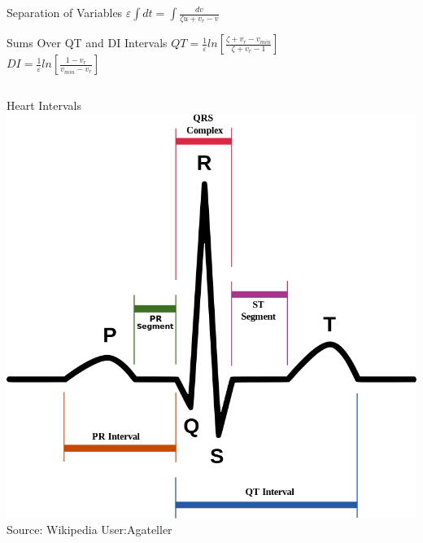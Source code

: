 \documentclass[final,hyperref={pdfpagelabels=false}]{beamer}
\begin{document}
\begin{frame}{}
\begin{columns}
\begin{column}{.48\linewidth}
        \begin{block}{Separation of Variables}
            \centering
            \(\varepsilon \int dt = \int \frac{dv}{\zeta u + v_r -v}\)
        \end{block}

        \begin{block}{Sums Over QT and DI Intervals}
            \centering
            \(QT = \frac{1}{\varepsilon} ln[\frac{\zeta + v_r - v_{min}}{\zeta + v_r - 1}]\) \\[2ex]
            \(DI = \frac{1}{\varepsilon} ln[\frac{1-v_r}{v_{min}-v_r}]\)
        \end{block}
      \end{column}
    \end{columns}

    \begin{columns}
        \begin{column}{.98\linewidth}
            \begin{block}{Heart Intervals}
                \centering
                \includegraphics{qt.png} \\
                Source: Wikipedia User:Agateller
            \end{block}
        \end{column}
    \end{columns}


\end{frame}
\end{document}
